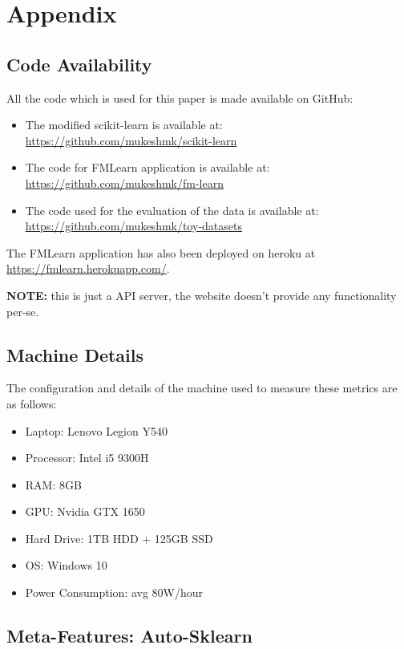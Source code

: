 \chapter{Appendix}
\section{Code Availability}
All the code which is used for this paper is made available on GitHub:
\begin{itemize}
    \item The modified scikit-learn is available at: \newline \href{https://github.com/mukeshmk/scikit-learn}{https://github.com/mukeshmk/scikit-learn}
    \item The code for FMLearn application is available at: \newline \href{https://github.com/mukeshmk/fm-learn}{https://github.com/mukeshmk/fm-learn}
    \item The code used for the evaluation of the data is available at: \newline \href{https://github.com/mukeshmk/toy-datasets}{https://github.com/mukeshmk/toy-datasets}
\end{itemize}
The FMLearn application has also been deployed on heroku at \href{https://fmlearn.herokuapp.com/}{https://fmlearn.herokuapp.com/}. 

\textbf{NOTE:} this is just a API server, the website doesn't provide any functionality per-se.

\section{Machine Details}
\label{machine-details}
The configuration and details of the machine used to measure these metrics are as follows:

\begin{itemize}
    \item Laptop: Lenovo Legion Y540
    \item Processor: Intel i5 9300H
    \item RAM: 8GB
    \item GPU: Nvidia GTX 1650
    \item Hard Drive: 1TB HDD + 125GB SSD
    \item OS: Windows 10
    \item Power Consumption: avg 80W/hour
\end{itemize}

\newpage
\section{Meta-Features: Auto-Sklearn}
\label{meta-features-ask}

